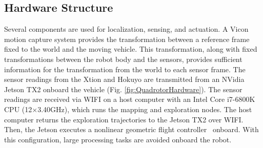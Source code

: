 \documentclass[smallextended]{svjour3}       %
\begin{document}
\subsection{Hardware Structure}

Several components are used for localization, sensing, and actuation. A Vicon motion capture system provides the transformation between a reference frame fixed to the world and the moving vehicle. This transformation, along with fixed transformations between the robot body and the sensors, provides sufficient information for the transformation from the world to each sensor frame. The sensor readings from the Xtion and Hokuyo are transmitted from an NVidia Jetson TX2 onboard the vehicle (Fig. \ref{fig:QuadrotorHardware}). The sensor readings are received via WIFI on a host computer with an Intel Core i7-6800K CPU (12$\times$3.40GHz), which runs the mapping and exploration nodes. The host computer returns the exploration trajectories to the Jetson TX2 over WIFI. Then, the Jetson executes a nonlinear geometric flight controller~\cite{GooDaeLee13} onboard. With this configuration, large processing tasks are avoided onboard the robot.
		
\end{document}
